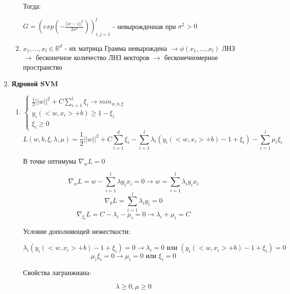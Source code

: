 \documentclass[a4paper, 12pt]{article}
\begin{document}
\begin{enumerate}
\begin{enumerate}
        Тогда:
        
        $G = (exp\left(-\frac{||x - z||^{2}}{2\sigma^{2}}\right))^{l}_{i, j = 1}$ - невырожденная при $\sigma^{2} > 0$
        \item $x_{1}, ..., x_{l} \in \mathbb{R}^{d}$ - их матрица Грамма невырождена $\rightarrow \phi(x_{1}, ..., x_{l})$ ЛНЗ $\rightarrow$ бесконечное количество ЛНЗ векторов $\rightarrow$ бесконечномерное пространство
    \end{enumerate}
    \item \textbf{Ядровой SVM}
    \begin{enumerate}
        \item $ \begin{cases}
        \frac{1}{2}||w||^{2} + C\sum_{i = 1}^{l} \xi_{i} \rightarrow min_{w, b, \xi} \\
        y_{i}(<w, x_{i}> + b) \geq 1 - \xi_{i} \\
        \xi_{i} \geq 0
        \end{cases} $
        \[L(w, b, \xi, \lambda, \mu) = \frac{1}{2}||w||^2 + C\sum_{i = 1}^{d}\xi_i - \sum_{i = 1}^{l}\lambda_i (y_i(<w, x_i> + b) - 1 + \xi_i) - \sum_{i = 1}^l \mu_i \xi_i\]
        
        В точке оптимума $\nabla_w L = 0$
        
        \[\nabla_w L = w - \sum_{i = 1}^l \lambda y_i x_i = 0 \rightarrow w = \sum_{i = 1}^l \lambda_i y_i x_i\]
        \[\nabla_b L = \sum_{i = 1}^{l} \lambda_i y_i = 0\]
        \[\nabla_{\xi_i} L = C - \lambda_i - \mu_i = 0 \rightarrow \lambda_i + \mu_i = C\]
        
        Условие дополняющей нежесткости:
        
        \[\lambda_i (y_i(<w, x_i> + b) - 1 + \xi_i) = 0 \rightarrow \lambda_i = 0 \textrm{ или } (y_i(<w, x_i> + b) - 1 + \xi_i) =0\]
        \[\mu_i \xi_i = 0 \rightarrow \mu_i = 0 \textrm{ или } \xi_i = 0\]

        Свойства лагранжиана:

        \[\lambda \geq 0, \mu \geq 0\]


\end{enumerate}
\end{enumerate}
\end{document}
